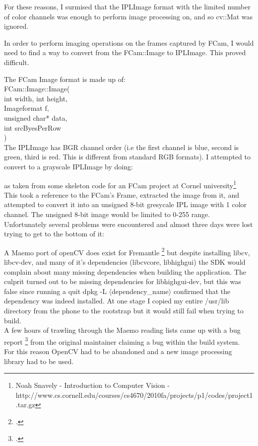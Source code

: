 \documentclass[11pt]{article} %
\newcommand{\tab}{\hspace*{2em}}
\begin{document}
For these reasons, I surmised that the IPLImage format with the limited number of color channels was enough to perform image processing on, and so cv::Mat was ignored.

In order to perform imaging operations on the frames captured by FCam, I would need to find a way to convert from the FCam::Image to IPLImage. This proved difficult.

The FCam Image format is made up of:\\
\tab FCam::Image::Image(\\
\tab\tab int width,  int height,\\
\tab\tab Imageformat f,\\
\tab\tab unsigned char* data,\\
\tab\tab int srcByesPerRow\\
)\\
The IPLImage has BGR channel order (i.e the first channel is blue, second is green, third is red. This is different from standard RGB formats). I attempted to convert to a grayscale IPLImage by doing:
\begin{frame}{}

\end{frame}
as taken from some skeleton code for an FCam project at Cornel university\footnote{Noah Snavely - Introduction to Computer Vision - http://www.cs.cornell.edu/courses/cs4670/2010fa/projects/p1/codes/project1.tar.gz}\\
This took a reference to the FCam's Frame, extracted the image from it, and attempted to convert it into an unsigned 8-bit gresycale IPL image with 1 color channel. The unsigned 8-bit image would be limited to 0-255 range.\\
Unfortunately several problems were encountered and almost three days were lost trying to get to the bottom of it:

A Maemo port of openCV does exist for Fremantle \footcite{libcv} but despite installing libcv, libcv-dev, and many of it's dependencies (libcvcore, libhighgui) the SDK would complain about many missing dependencies when building the application. The culprit turned out to be missing dependencies for libhighgui-dev, but this was false since running a quit dpkg -L \(\langle\)dependency\_name\(\rangle\) confirmed that the dependency was indeed installed. At one stage I copied my entire /usr/lib directory from the phone to the rootstrap but it would still fail when trying to build.\\
A few hours of trawling through the Maemo reading lists came up with a bug report \footcite{highgui-dev} from the original maintainer claiming a bug within the build system.\\
For this reason OpenCV had to be abandoned and a new image processing library had to be used.
\end{document}
